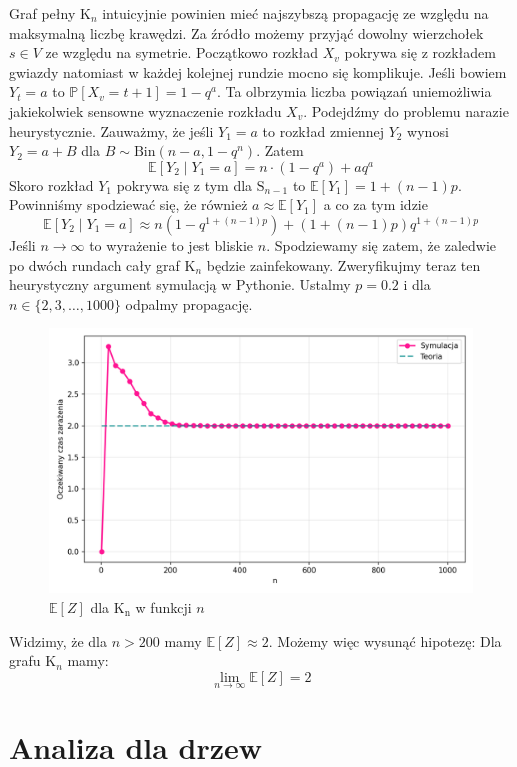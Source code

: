 Graf pełny $\mathrm{K}_n$ intuicyjnie powinien mieć najszybszą propagację ze względu na maksymalną liczbę krawędzi. Za źródło możemy przyjąć dowolny wierzchołek $s\in V$ ze względu na symetrie. Początkowo rozkład $X_v$ pokrywa się z rozkładem gwiazdy natomiast w każdej kolejnej rundzie mocno się komplikuje. Jeśli bowiem $Y_t=a$ to $\mathbb{P}[X_v = t+1] = 1 - q^a$. Ta olbrzymia liczba powiązań uniemożliwia jakiekolwiek sensowne wyznaczenie rozkładu $X_v$. Podejdźmy do problemu narazie heurystycznie. Zauważmy, że jeśli $Y_1=a$ to rozkład zmiennej $Y_2$ wynosi $Y_2 = a + B$ dla $B \sim \mathrm{Bin}(n-a, 1-q^n)$. Zatem 
\[
    \mathbb{E}[Y_2\mid Y_1 = a] = n\cdot (1-q^a) + aq^a
\]
Skoro rozkład $Y_1$ pokrywa się z tym dla $\mathrm{S}_{n-1}$ to $\mathbb{E}[Y_1]=1+(n-1)p$. Powinniśmy spodziewać się, że również $a \approx \mathbb{E}[Y_1]$ a co za tym idzie 
\[
    \mathbb{E}[Y_2\mid Y_1 = a] \approx n(1-q^{1+(n-1)p})+(1+(n-1)p)q^{1+(n-1)p} 
\]
Jeśli $n\to\infty$ to wyrażenie to jest bliskie $n$. Spodziewamy się zatem, że zaledwie po dwóch rundach cały graf $\mathrm{K}_n$ będzie zainfekowany. Zweryfikujmy teraz ten heurystyczny argument symulacją w Pythonie. Ustalmy $p=0.2$ i dla $n\in\{2,3,\dots,1000\}$ odpalmy propagację. 
\begin{figure}[h!]
    \centering
    \includegraphics[width=1\textwidth]{../img/complete/full_infection_expectation.png}
    \caption{$\mathbb{E}[Z]$ dla $\mathrm{K_n}$ w funkcji $n$}
\end{figure}
Widzimy, że dla $n>200$ mamy $\mathbb{E}[Z] \approx 2$. Możemy więc wysunąć hipotezę: Dla grafu $\mathrm{K}_n$ mamy:
\[
    \lim_{n\to\infty} \mathbb{E}[Z] = 2
\]


\section{Analiza dla drzew}

